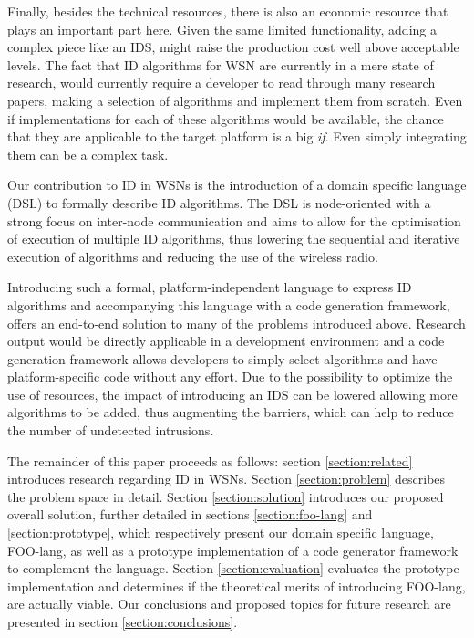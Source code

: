 \documentclass[conference]{IEEEtran}
\begin{document}
Finally, besides the technical resources, there is also an economic resource
that plays an important part here. Given the same limited functionality, adding
a complex piece like an IDS, might raise the production cost well above
acceptable levels. The fact that ID algorithms for WSN are currently in a mere
state of research, would currently require a developer to read through many
research papers, making a selection of algorithms and implement them from
scratch. Even if implementations for each of these algorithms would be
available, the chance that they are applicable to the target platform is a big
\emph{if}. Even simply integrating them can be a complex task.

Our contribution to ID in WSNs is the introduction of a domain specific
language (DSL) to formally describe ID algorithms. The DSL is node-oriented
with a strong focus on inter-node communication and aims to allow for the
optimisation of execution of multiple ID algorithms, thus lowering the
sequential and iterative execution of algorithms and reducing the use of the
wireless radio.

Introducing such a formal, platform-independent language to express ID
algorithms and accompanying this language with a code generation framework,
offers an end-to-end solution to many of the problems introduced above.
Research output would be directly applicable in a development environment and a
code generation framework allows developers to simply select algorithms and
have platform-specific code without any effort. Due to the possibility to
optimize the use of resources, the impact of introducing an IDS can be lowered
allowing more algorithms to be added, thus augmenting the barriers, which can
help to reduce the number of undetected intrusions.

The remainder of this paper proceeds as follows: section \ref{section:related}
introduces research regarding ID in WSNs. Section \ref{section:problem}
describes the problem space in detail. Section \ref{section:solution}
introduces our proposed overall solution, further detailed in sections
\ref{section:foo-lang} and \ref{section:prototype}, which respectively present
our domain specific language, FOO-lang, as well as a prototype implementation
of a code generator framework to complement the language. Section
\ref{section:evaluation} evaluates the prototype implementation and determines
if the theoretical merits of introducing FOO-lang, are actually viable. Our
conclusions and proposed topics for future research are presented in section
\ref{section:conclusions}.
\end{document}

